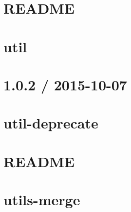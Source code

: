 \documentclass[twoside]{book}
\newcommand{\+}{\discretionary{\mbox{\scriptsize$\hookleftarrow$}}{}{}}
\begin{document}
\chapter{R\+E\+A\+D\+ME}
\label{md__c_1_workspace_demo_src_main_script_node_modules_util_node_modules_inherits__r_e_a_d_m_e}

\chapter{util}
\label{md__c_1_workspace_demo_src_main_script_node_modules_util__r_e_a_d_m_e}

\chapter{1.0.2 / 2015-\/10-\/07}
\label{md__c_1_workspace_demo_src_main_script_node_modules_util-deprecate__history}

\chapter{util-\/deprecate}
\label{md__c_1_workspace_demo_src_main_script_node_modules_util-deprecate__r_e_a_d_m_e}

\chapter{R\+E\+A\+D\+ME}
\label{md__c_1_workspace_demo_src_main_script_node_modules_utila__r_e_a_d_m_e}

\chapter{utils-\/merge}
\label{md__c_1_workspace_demo_src_main_script_node_modules_utils-merge__r_e_a_d_m_e}

\end{document}
